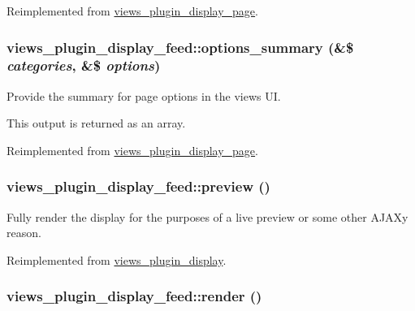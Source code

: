 Reimplemented from \hyperlink{classviews__plugin__display__page_9b03d35a15fcfcae4a474ea56b6ca5b6}{views\_\-plugin\_\-display\_\-page}.\hypertarget{classviews__plugin__display__feed_5c0b5faad36090985c85b16a454023a6}{
\subsubsection[{options\_\-summary}]{\setlength{\rightskip}{0pt plus 5cm}views\_\-plugin\_\-display\_\-feed::options\_\-summary (\&\$ {\em categories}, \/  \&\$ {\em options})}}
\label{classviews__plugin__display__feed_5c0b5faad36090985c85b16a454023a6}


Provide the summary for page options in the views UI.

This output is returned as an array. 

Reimplemented from \hyperlink{classviews__plugin__display__page_47de087f3201600b057e0d4a55eef48c}{views\_\-plugin\_\-display\_\-page}.\hypertarget{classviews__plugin__display__feed_e5e20d2999e052f50486b5d03b4fb105}{
\subsubsection[{preview}]{\setlength{\rightskip}{0pt plus 5cm}views\_\-plugin\_\-display\_\-feed::preview ()}}
\label{classviews__plugin__display__feed_e5e20d2999e052f50486b5d03b4fb105}


Fully render the display for the purposes of a live preview or some other AJAXy reason. 

Reimplemented from \hyperlink{classviews__plugin__display_39a392ae163b9d5850559e3cf098e64f}{views\_\-plugin\_\-display}.\hypertarget{classviews__plugin__display__feed_661fe08fd1be956d5b5cc40f36daf26b}{
\subsubsection[{render}]{\setlength{\rightskip}{0pt plus 5cm}views\_\-plugin\_\-display\_\-feed::render ()}}
\label{classviews__plugin__display__feed_661fe08fd1be956d5b5cc40f36daf26b}


